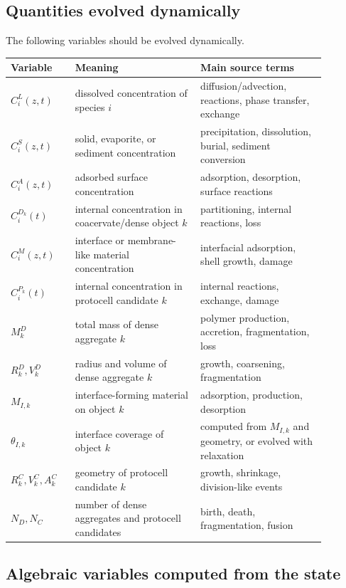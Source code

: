 \documentclass[11pt]{article}
\begin{document}
\subsection{Quantities evolved dynamically}

The following variables should be evolved dynamically.
\begin{center}
\begin{tabular}{p{0.18\linewidth}p{0.35\linewidth}p{0.35\linewidth}}
\toprule
Variable & Meaning & Main source terms \\
\midrule
$C_i^L(z,t)$ & dissolved concentration of species $i$ & diffusion/advection, reactions, phase transfer, exchange \\
$C_i^S(z,t)$ & solid, evaporite, or sediment concentration & precipitation, dissolution, burial, sediment conversion \\
$C_i^A(z,t)$ & adsorbed surface concentration & adsorption, desorption, surface reactions \\
$C_i^{D_k}(t)$ & internal concentration in coacervate/dense object $k$ & partitioning, internal reactions, loss \\
$C_i^M(z,t)$ & interface or membrane-like material concentration & interfacial adsorption, shell growth, damage \\
$C_i^{P_k}(t)$ & internal concentration in protocell candidate $k$ & internal reactions, exchange, damage \\
$M_k^D$ & total mass of dense aggregate $k$ & polymer production, accretion, fragmentation, loss \\
$R_k^D,V_k^D$ & radius and volume of dense aggregate $k$ & growth, coarsening, fragmentation \\
$M_{I,k}$ & interface-forming material on object $k$ & adsorption, production, desorption \\
$\theta_{I,k}$ & interface coverage of object $k$ & computed from $M_{I,k}$ and geometry, or evolved with relaxation \\
$R_k^C,V_k^C,A_k^C$ & geometry of protocell candidate $k$ & growth, shrinkage, division-like events \\
$N_D,N_C$ & number of dense aggregates and protocell candidates & birth, death, fragmentation, fusion \\
\bottomrule
\end{tabular}
\end{center}

\subsection{Algebraic variables computed from the state}
\end{document}

